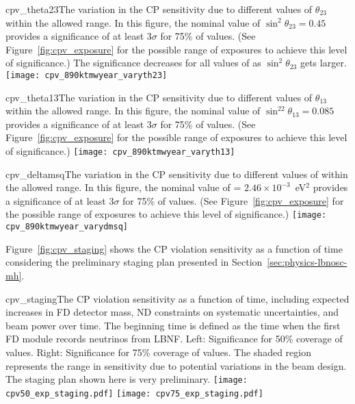 \begin{cdrfigure}{cpv_theta23}{The variation in the CP sensitivity due to different values of $\theta_{23}$ within the allowed range.  In this figure, the nominal value of $\sin^2\theta_{23} = 0.45$ provides a significance of at least 3$\sigma$ for 75\% of \deltacp values. (See Figure~\ref{fig:cpv_exposure} for the possible range of exposures to achieve this level of significance.) The significance decreases for all values of \deltacp as $\sin^2\theta_{23}$ gets larger.}
 \texttt{[image: cpv\_890ktmwyear\_varyth23]}
\end{cdrfigure}

\begin{cdrfigure}{cpv_theta13}{The variation in the CP sensitivity due to different values of $\theta_{13}$ within the allowed range.  In this figure, the nominal value of $\sin^22\theta_{13} = 0.085$ provides a significance of at least 3$\sigma$ for 75\% of \deltacp values. (See Figure~\ref{fig:cpv_exposure} for the possible range of exposures to achieve this level of significance.)}
 \texttt{[image: cpv\_890ktmwyear\_varyth13]}
\end{cdrfigure}

\begin{cdrfigure}{cpv_deltamsq}{The variation in the CP sensitivity due to different values of  within the allowed range.  In this figure, the nominal value of  = $2.46\times 10^{-3}$~eV$^2$ provides a significance of at least 3$\sigma$ for 75\% of \deltacp values.  (See Figure~\ref{fig:cpv_exposure} for the possible range of exposures to achieve this level of significance.)}
 \texttt{[image: cpv\_890ktmwyear\_varydmsq]}
\end{cdrfigure}

Figure~\ref{fig:cpv_staging} shows the CP violation sensitivity as a function of time considering the preliminary staging plan presented in Section~\ref{sec:physics-lbnosc-mh}.

\begin{cdrfigure}{cpv_staging}{The CP violation sensitivity as a function of time, including expected increases in FD detector mass, ND constraints on systematic uncertainties, and beam power over time.  The beginning time is defined as the time when the first FD module records neutrinos from LBNF.  Left: Significance for 50\% coverage of \deltacp values.  Right: Significance for 75\% coverage of \deltacp values.  The shaded region represents the range in sensitivity due to potential variations in the beam design.  The staging plan shown here is very preliminary.}
 \texttt{[image: cpv50\_exp\_staging.pdf]}
 \texttt{[image: cpv75\_exp\_staging.pdf]}
\end{cdrfigure}

